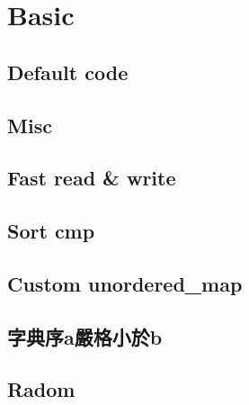 \documentclass[a4paper,10pt,twocolumn,oneside]{article}
\begin{document}
\pagestyle{fancy}
\fancyfoot{}
\fancyhead[R]{\thepage}
\renewcommand{\headrulewidth}{0.4pt}
\renewcommand{\contentsname}{Contents} 

\scriptsize
\tableofcontents

\section{Basic}

\subsection{Default code}


\subsection{Misc}


\subsection{Fast read \& write}


\subsection{Sort cmp}


\subsection{Custom unordered_map}


\subsection{字典序a嚴格小於b}


\subsection{Radom}


\end{document}
